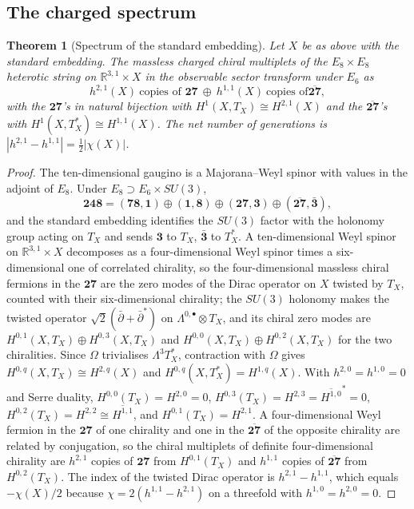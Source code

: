 \documentclass[11pt]{amsart}
\newtheorem{theorem}{Theorem}
\theoremstyle{definition}
\theoremstyle{remark}
\newcommand{\R}{\mathbb{R}}
\begin{document}
\subsection{The charged spectrum}

\begin{theorem}[Spectrum of the standard embedding]\label{thm:dictionary}
Let $X$ be as above with the standard embedding. The massless charged
chiral multiplets of the $E_8\times E_8$ heterotic string on $\R^{3,1}
\times X$ in the observable sector transform under $E_6$ as
\[
h^{2,1}(X)\ \text{copies of }\mathbf{27}\ \oplus\ h^{1,1}(X)\ \text{copies of
}\overline{\mathbf{27}},
\]
with the $\mathbf{27}$'s in natural bijection with $H^1(X,T_X)\cong
H^{2,1}(X)$ and the $\overline{\mathbf{27}}$'s with $H^1(X,T_X^*)\cong
H^{1,1}(X)$. The net number of generations is
$|h^{2,1}-h^{1,1}|=\tfrac12|\chi(X)|$.
\end{theorem}

\begin{proof}
The ten-dimensional gaugino is a Majorana--Weyl spinor with values in the
adjoint of $E_8$. Under $E_8\supset E_6\times SU(3)$,
\[
\mathbf{248}=(\mathbf{78},\mathbf1)\oplus(\mathbf1,\mathbf8)\oplus
(\mathbf{27},\mathbf3)\oplus(\overline{\mathbf{27}},\bar{\mathbf3}),
\]
and the standard embedding identifies the $SU(3)$ factor with the holonomy
group acting on $T_X$ and sends $\mathbf3$ to $T_X$, $\bar{\mathbf3}$ to
$T_X^*$. A ten-dimensional Weyl spinor on $\R^{3,1}\times X$ decomposes as
a four-dimensional Weyl spinor times a six-dimensional one of correlated
chirality, so the four-dimensional massless chiral fermions in the
$\mathbf{27}$ are the zero modes of the Dirac operator on $X$ twisted by
$T_X$, counted with their six-dimensional chirality; the $SU(3)$ holonomy
makes the twisted operator $\sqrt2(\bar\partial+\bar\partial^*)$ on
$\Lambda^{0,\bullet}\otimes T_X$, and its chiral zero modes are
$H^{0,1}(X,T_X)\oplus H^{0,3}(X,T_X)$ and $H^{0,0}(X,T_X)\oplus
H^{0,2}(X,T_X)$ for the two chiralities. Since $\Omega$ trivialises
$\Lambda^3T_X^*$, contraction with $\Omega$ gives $H^{0,q}(X,T_X)\cong
H^{2,q}(X)$ and $H^{0,q}(X,T_X^*)=H^{1,q}(X)$. With $h^{2,0}=h^{1,0}=0$
and Serre duality, $H^{0,0}(T_X)=H^{2,0}=0$, $H^{0,3}(T_X)=
H^{2,3}=\overline{H^{1,0}}^*=0$, $H^{0,2}(T_X)=H^{2,2}\cong
\overline{H^{1,1}}$, and $H^{0,1}(T_X)=H^{2,1}$. A four-dimensional Weyl
fermion in the $\mathbf{27}$ of one chirality and one in the
$\overline{\mathbf{27}}$ of the opposite chirality are related by
conjugation, so the chiral multiplets of definite four-dimensional
chirality are $h^{2,1}$ copies of $\mathbf{27}$ from $H^{0,1}(T_X)$ and
$h^{1,1}$ copies of $\overline{\mathbf{27}}$ from $H^{0,2}(T_X)$. The index
of the twisted Dirac operator is $h^{2,1}-h^{1,1}$, which equals $-\chi(X)/2$
because $\chi=2(h^{1,1}-h^{2,1})$ on a threefold with $h^{1,0}=h^{2,0}=0$.
\end{proof}
\end{document}
